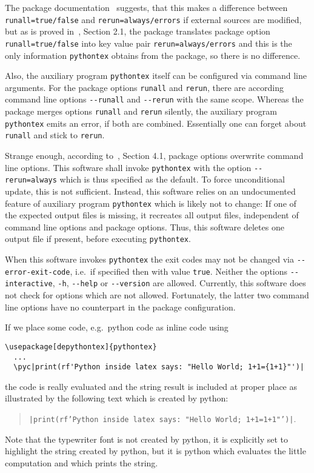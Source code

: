 The package documentation~\cite{PythonTexP} suggests, 
that this makes a difference between \texttt{runall=true/false} 
and \texttt{rerun=always/errors} if external sources are modified, 
but as is proved in~\cite{PyTexInOut}, Section 2.1, 
the package translates package option \texttt{runall=true/false} into key value pair \texttt{rerun=always/errors} 
and this is the only information \texttt{pythontex} obtains from the package, 
so there is no difference. 

Also, the auxiliary program \texttt{pythontex} itself can be configured via command line arguments. 
For the package options \texttt{runall} and \texttt{rerun}, 
there are according command line options \texttt{-{}-runall} and \texttt{-{}-rerun} with the same scope. 
Whereas the package merges options \texttt{runall} and \texttt{rerun} silently, 
the auxiliary program \texttt{pythontex} emits an error, if both are combined. 
Essentially one can forget about \texttt{runall} and stick to \texttt{rerun}. 

Strange enough, according to~\cite{PythonTexP}, Section 4.1, package options overwrite command line options. 
This software shall invoke \texttt{pythontex} 
with the option \texttt{-{}-rerun=always} which is thus specified as the default. 
To force unconditional update, this is not sufficient. 
Instead, this software relies on an undocumented feature of auxiliary program \texttt{pythontex} 
which is likely not to change: 
If one of the expected output files is missing, it recreates all output files, independent of command line options and package options. 
Thus, this software deletes one output file if present, before executing \texttt{pythontex}. 

When this software invokes \texttt{pythontex} 
the exit codes may not be changed via \texttt{-{}-error-exit-code}, 
i.e.~if specified then with value \texttt{true}. 
Neither the options \texttt{-{}-interactive}, \texttt{-h}, \texttt{-{}-help} or \texttt{-{}-version} are allowed. 
Currently, this software does not check for options which are not allowed. 
Fortunately, the latter two command line options have no counterpart in the package configuration. 




If we place some code, e.g.~python code as inline code using 
%
\begin{lstlisting}[basicstyle=\footnotesize]
  \usepackage[depythontex]{pythontex}
  ...
  \pyc|print(rf'Python inside latex says: "Hello World; 1+1={1+1}"')|
\end{lstlisting}
%
the code is really evaluated and the string result is included at proper place 
as illustrated by the following text which is created by python: 
%
\begin{quote}
  \texttt{\pyc|print(rf'Python inside latex says: "Hello World; 1+1={1+1}"')|}. %
\end{quote}
%
Note that the typewriter font is not created by python, 
it is explicitly set to highlight the string created by python, 
but it is python which evaluates the little computation 
and which prints the string. 

